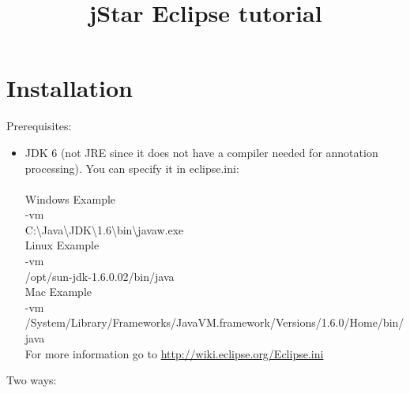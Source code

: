 \documentclass{article}
\begin{document}
\title{jStar Eclipse tutorial} 
\maketitle 


\section{Installation}

Prerequisites:
\begin{itemize}
   \item JDK 6 (not JRE since it does not have a compiler needed for annotation processing). You can specify it in eclipse.ini:\\\\
Windows Example\\
-vm\\
C:\textbackslash Java\textbackslash JDK\textbackslash 1.6\textbackslash bin\textbackslash javaw.exe\\

Linux Example\\
-vm\\
/opt/sun-jdk-1.6.0.02/bin/java\\

Mac Example\\
-vm\\
/System/Library/Frameworks/JavaVM.framework/Versions/1.6.0/Home/bin/java\\

For more information go to \href{http://wiki.eclipse.org/Eclipse.ini}{http://wiki.eclipse.org/Eclipse.ini}

\end{itemize}
Two ways:
\end{document}
